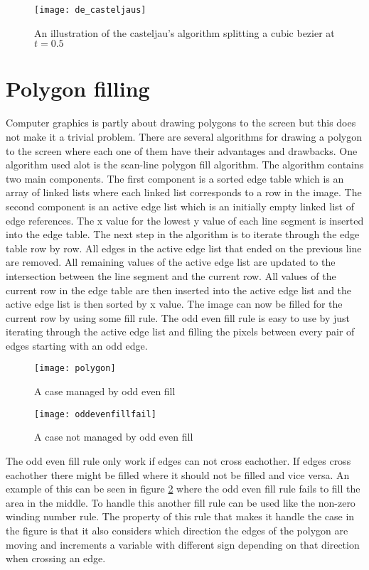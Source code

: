 \begin{figure}[H]
\texttt{[image: de\_casteljaus]}
\caption{An illustration of the casteljau's algorithm splitting a cubic bezier at $t=0.5$}
\label{fig:decasteljaus}
\end{figure}

\section{Polygon filling}
Computer graphics is partly about drawing polygons to the screen but this does not make it a trivial problem. There are several algorithms for drawing a polygon to the screen where each one of them have their advantages and drawbacks. One algorithm used alot is the scan-line polygon fill algorithm. The algorithm contains two main components. The first component is a sorted edge table which is an array of linked lists where each linked list corresponds to a row in the image. The second component is an active edge list which is an initially empty linked list of edge references. The x value for the lowest y value of each line segment is inserted into the edge table. The next step in the algorithm is to iterate through the edge table row by row. All edges in the active edge list that ended on the previous line are removed. All remaining values of the active edge list are updated to the intersection between the line segment and the current row. All values of the current row in the edge table are then inserted into the active edge list and the active edge list is then sorted by x value. The image can now be filled for the current row by using some fill rule. The odd even fill rule is easy to use by just iterating through the active edge list and filling the pixels between every pair of edges starting with an odd edge.

\begin{figure}[H]
  \texttt{[image: polygon]}
  \caption{A case managed by odd even fill}\label{fig:awesome_image1}
\endminipage\hfill
{}
  \texttt{[image: oddevenfillfail]}
  \caption{A case not managed by odd even fill}\label{fig:awesome_image2}
	\label{fig:poly}
\endminipage\hfill
\end{figure}

The odd even fill rule only work if edges can not cross eachother. If edges cross eachother there might be filled where it should not be filled and vice versa. An example of this can be seen in figure \ref{fig:poly} where the odd even fill rule fails to fill the area in the middle. To handle this another fill rule can be used like the non-zero winding number rule. The property of this rule that makes it handle the case in the figure is that it also considers which direction the edges of the polygon are moving and increments a variable with different sign depending on that direction when crossing an edge.
